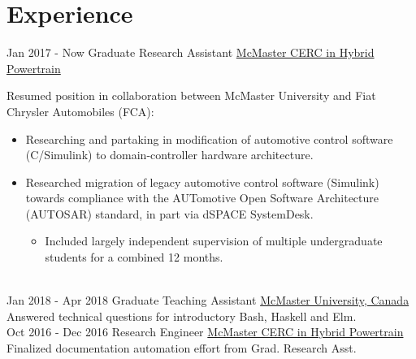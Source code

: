 \documentclass[letterpaper]{twentysecondcv} %
\begin{document}
\section{Experience}
\vspace{-.5em}
\begin{twenty} %
  \twentyitem
  {Jan 2017 -}
  {Now}
  {Graduate Research Assistant}
  {%
    \href{http://hybrid.mcmaster.ca/}{McMaster CERC in Hybrid Powertrain}}
  {}
  {Resumed position in collaboration between McMaster University and Fiat Chrysler Automobiles (FCA):\begin{itemize}
      \item Researching and partaking in modification of automotive control software (C/Simulink) to domain-controller hardware architecture.
			\item Researched migration of legacy automotive control software (Simulink) towards compliance with the AUTomotive Open Software Architecture (AUTOSAR) standard, in part via dSPACE SystemDesk.
      \begin{itemize}
        \item Included largely independent supervision of multiple undergraduate students for a combined 12 months.
      \end{itemize}
	\end{itemize}}
	\\
  \twentyitem
  {Jan 2018 -}
  {Apr 2018}
  {Graduate Teaching Assistant}
  {\href{https://www.mcmaster.ca/}{McMaster University, Canada}}
  {}
  {Answered technical questions for introductory Bash, Haskell and Elm.
}
  \\
	\twentyitem
	{Oct 2016 -}
	{Dec 2016}
	{Research Engineer}
	{\href{http://hybrid.mcmaster.ca/}{McMaster CERC in Hybrid Powertrain}}
	{}
	{Finalized documentation automation effort from Grad. Research Asst.
}
	\\

\end{twenty}
\end{document}
